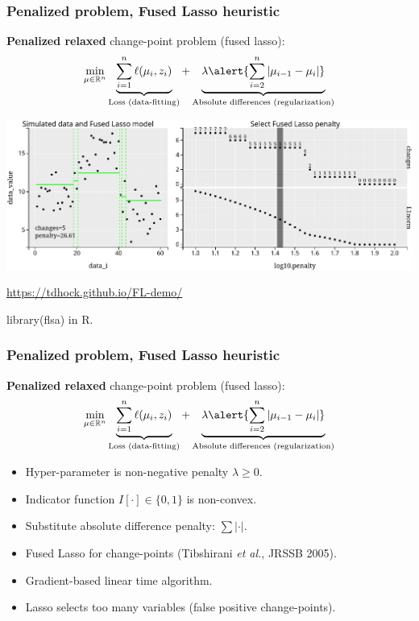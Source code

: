 \documentclass{beamer}
\newcommand{\RR}{\mathbb R}
\begin{document}
\begin{frame}
  \frametitle{Penalized problem, Fused Lasso heuristic}
  \textbf{Penalized relaxed} change-point problem (fused lasso):
$$
\min_{
  \mathbf \mu\in\RR^{n}
}
\underbrace{
  \sum_{i=1}^{n} \ell( \mu_i,  z_i)
}_{
  \text{Loss (data-fitting)}
}
+
\underbrace{
  \lambda  
  \alert{\sum_{i=2}^n |\mu_{i-1}-\mu_{i}|}
}_{
  \text{Absolute differences (regularization)}
}
$$

\includegraphics[width=\textwidth]{FL-demo}

\url{https://tdhock.github.io/FL-demo/}

library(flsa) in R.

\end{frame}

\begin{frame}
  \frametitle{Penalized problem, Fused Lasso heuristic}
  \textbf{Penalized relaxed} change-point problem (fused lasso):
$$
\min_{
  \mathbf \mu\in\RR^{n}
}
\underbrace{
  \sum_{i=1}^{n} \ell( \mu_i,  z_i)
}_{
  \text{Loss (data-fitting)}
}
+
\underbrace{
  \lambda  
  \alert{\sum_{i=2}^n |\mu_{i-1}-\mu_{i}|}
}_{
  \text{Absolute differences (regularization)}
}
$$
\begin{itemize}
\item Hyper-parameter is non-negative penalty $\lambda\geq 0$.
\item Indicator function $I[\cdot ]\in\{0,1\}$ is non-convex.
\item Substitute absolute difference penalty: \alert{$\sum |\cdot|$}.
\item Fused Lasso for change-points (Tibshirani \emph{et al.}, JRSSB 2005).
\item Gradient-based linear time algorithm.
\item Lasso selects too many variables (false positive change-points).
\end{itemize}
\end{frame}
\end{document}
